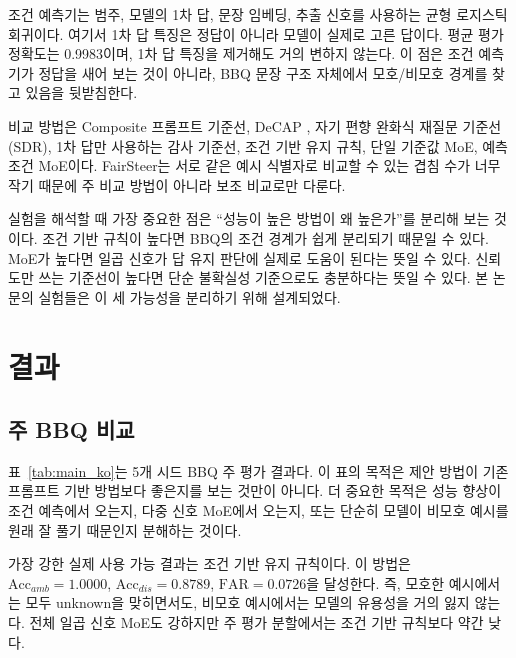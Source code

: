 \documentclass{ieeeaccess}
\newcommand{\accamb}{\mathrm{Acc}_{amb}}
\newcommand{\accdis}{\mathrm{Acc}_{dis}}
\newcommand{\far}{\mathrm{FAR}}
\begin{document}
조건 예측기는 범주, 모델의 1차 답, 문장 임베딩, 추출 신호를 사용하는 균형 로지스틱 회귀이다. 여기서 1차 답 특징은 정답이 아니라 모델이 실제로 고른 답이다. 평균 평가 정확도는 0.9983이며, 1차 답 특징을 제거해도 거의 변하지 않는다. 이 점은 조건 예측기가 정답을 새어 보는 것이 아니라, BBQ 문장 구조 자체에서 모호/비모호 경계를 찾고 있음을 뒷받침한다.

비교 방법은 Composite 프롬프트 기준선, DeCAP \cite{bae2025decap}, 자기 편향 완화식 재질문 기준선(SDR), 1차 답만 사용하는 감사 기준선, 조건 기반 유지 규칙, 단일 기준값 MoE, 예측 조건 MoE이다. FairSteer는 서로 같은 예시 식별자로 비교할 수 있는 겹침 수가 너무 작기 때문에 주 비교 방법이 아니라 보조 비교로만 다룬다.

실험을 해석할 때 가장 중요한 점은 ``성능이 높은 방법이 왜 높은가''를 분리해 보는 것이다. 조건 기반 규칙이 높다면 BBQ의 조건 경계가 쉽게 분리되기 때문일 수 있다. MoE가 높다면 일곱 신호가 답 유지 판단에 실제로 도움이 된다는 뜻일 수 있다. 신뢰도만 쓰는 기준선이 높다면 단순 불확실성 기준으로도 충분하다는 뜻일 수 있다. 본 논문의 실험들은 이 세 가능성을 분리하기 위해 설계되었다.

\section{결과}
\label{sec:results}

\subsection{주 BBQ 비교}
표~\ref{tab:main_ko}는 5개 시드 BBQ 주 평가 결과다. 이 표의 목적은 제안 방법이 기존 프롬프트 기반 방법보다 좋은지를 보는 것만이 아니다. 더 중요한 목적은 성능 향상이 조건 예측에서 오는지, 다중 신호 MoE에서 오는지, 또는 단순히 모델이 비모호 예시를 원래 잘 풀기 때문인지 분해하는 것이다.

가장 강한 실제 사용 가능 결과는 조건 기반 유지 규칙이다. 이 방법은 $\accamb=1.0000$, $\accdis=0.8789$, $\far=0.0726$을 달성한다. 즉, 모호한 예시에서는 모두 unknown을 맞히면서도, 비모호 예시에서는 모델의 유용성을 거의 잃지 않는다. 전체 일곱 신호 MoE도 강하지만 주 평가 분할에서는 조건 기반 규칙보다 약간 낮다.
\end{document}

